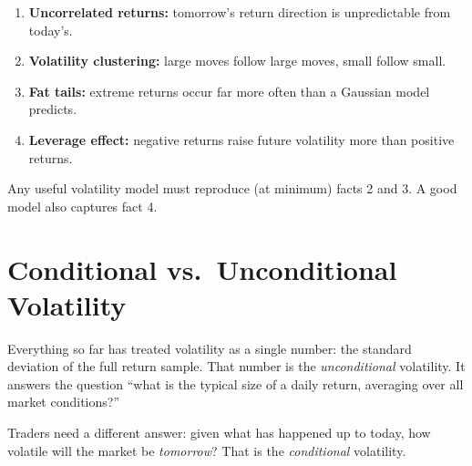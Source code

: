 \begin{keyidea}
\begin{enumerate}[nosep]
  \item \textbf{Uncorrelated returns:} tomorrow's return direction is unpredictable from today's.
  \item \textbf{Volatility clustering:} large moves follow large moves, small follow small.
  \item \textbf{Fat tails:} extreme returns occur far more often than a Gaussian model predicts.
  \item \textbf{Leverage effect:} negative returns raise future volatility more than positive returns.
\end{enumerate}
Any useful volatility model must reproduce (at minimum) facts 2 and 3.
A good model also captures fact 4.
\end{keyidea}

\section{Conditional vs.\ Unconditional Volatility}
\label{sec:cond-uncond}

Everything so far has treated volatility as a single number: the standard deviation of the full return sample.
That number is the \emph{unconditional} volatility.
It answers the question ``what is the typical size of a daily return, averaging over all market conditions?''

Traders need a different answer: given what has happened up to today, how volatile will the market be \emph{tomorrow}?
That is the \emph{conditional} volatility.

